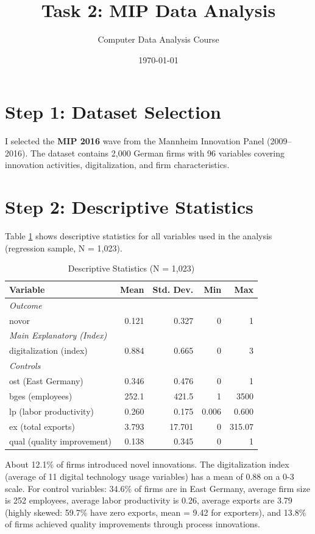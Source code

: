 \documentclass[a4paper,12pt]{article}
\title{\textbf{Task 2: MIP Data Analysis}}
\author{Computer Data Analysis Course}
\date{\today}
\begin{document}
\maketitle

\section*{Step 1: Dataset Selection}

I selected the \textbf{MIP 2016} wave from the Mannheim Innovation Panel (2009--2016). The dataset contains 2,000 German firms with 96 variables covering innovation activities, digitalization, and firm characteristics.

\section*{Step 2: Descriptive Statistics}

Table \ref{tab:desc} shows descriptive statistics for all variables used in the analysis (regression sample, N = 1,023).

\begin{table}[H]
\centering
\caption{Descriptive Statistics (N = 1,023)}
\label{tab:desc}
\begin{tabular}{lrrrr}
\toprule
Variable & Mean & Std. Dev. & Min & Max \\
\midrule
\textit{Outcome} & & & & \\
novor & 0.121 & 0.327 & 0 & 1 \\
\addlinespace
\textit{Main Explanatory (Index)} & & & & \\
digitalization (index) & 0.884 & 0.665 & 0 & 3 \\
\addlinespace
\textit{Controls} & & & & \\
ost (East Germany) & 0.346 & 0.476 & 0 & 1 \\
bges (employees) & 252.1 & 421.5 & 1 & 3500 \\
lp (labor productivity) & 0.260 & 0.175 & 0.006 & 0.600 \\
ex (total exports) & 3.793 & 17.701 & 0 & 315.07 \\
qual (quality improvement) & 0.138 & 0.345 & 0 & 1 \\
\bottomrule
\end{tabular}
\end{table}

About 12.1\% of firms introduced novel innovations. The digitalization index (average of 11 digital technology usage variables) has a mean of 0.88 on a 0-3 scale. For control variables: 34.6\% of firms are in East Germany, average firm size is 252 employees, average labor productivity is 0.26, average exports are 3.79 (highly skewed: 59.7\% have zero exports, mean = 9.42 for exporters), and 13.8\% of firms achieved quality improvements through process innovations.
\end{document}
